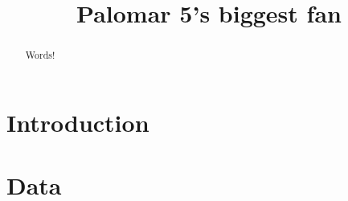 \documentclass[modern]{aastex62}
\begin{document}
\sloppy\sloppypar\raggedbottom\frenchspacing %

\title{Palomar 5's biggest fan}



\begin{abstract}\noindent %
    Words!
\end{abstract}


\section{Introduction}
\label{sec:intro}


\section{Data}
\label{sec:data}
\end{document}

